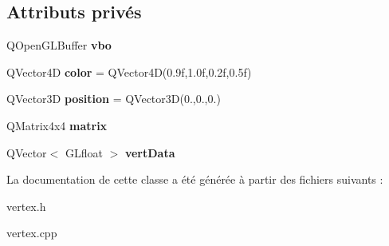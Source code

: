 \subsection*{Attributs privés}
\begin{DoxyCompactItemize}
\item 
\mbox{\label{classVertex_a9a8cffb291954fcb56c0cbfb48707ebd}} 
Q\+Open\+G\+L\+Buffer {\bfseries vbo}
\item 
\mbox{\label{classVertex_aec910fa0f349f62784662b0cfd93cd39}} 
Q\+Vector4D {\bfseries color} = Q\+Vector4D(0.\+9f,1.\+0f,0.\+2f,0.\+5f)
\item 
\mbox{\label{classVertex_a9725e493a29e668d7d757e7666626b6e}} 
Q\+Vector3D {\bfseries position} = Q\+Vector3D(0.,0.,0.)
\item 
\mbox{\label{classVertex_aa89741f9d15f1b78e9f54ebe9646156a}} 
Q\+Matrix4x4 {\bfseries matrix}
\item 
\mbox{\label{classVertex_ae7b1b3f56bedf713744358cb8b9da0ab}} 
Q\+Vector$<$ G\+Lfloat $>$ {\bfseries vert\+Data}
\end{DoxyCompactItemize}


La documentation de cette classe a été générée à partir des fichiers suivants \+:\begin{DoxyCompactItemize}
\item 
vertex.\+h\item 
vertex.\+cpp\end{DoxyCompactItemize}

